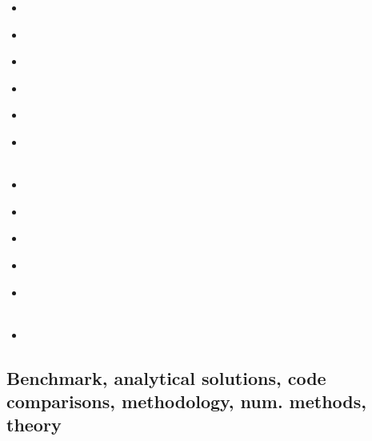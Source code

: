 \begin{scriptsize}
\begin{itemize}
\item[\nineteeneightytwo] 
\textcite{crpi82} \\
\item[\nineteeneightynine] 
\textcite{ribe89} \\
\item[\nineteenninetythree]
\textcite{shem93} \\
\item[\twothousandtwo] 
\textcite{hube02b} \\
\item[\twothousandfive] 
\textcite{lahb05} \\
\item[\twothousandsix] 
\textcite{basv06} \\
\textcite{cuhy06} \\
\item[\twothousandten] 
\textcite{habl10} \\
\item[\twothousandthirteen] 
\textcite{namu13} \\
\textcite{gogu14}
\item[\twothousandseventeen] 
\textcite{babm17} \\
\item[\twothousandnineteen] 
\textcite{magn19} \\
\item[\twothousandtwentyone] 
\textcite{scvg21} \\
\textcite{erhf21} \\
\item[\twothousandtwentytwo] 
\textcite{scva22} \\
\end{itemize}
\end{scriptsize}


\subsection{Benchmark, analytical solutions, code comparisons, methodology, num. methods, theory}

